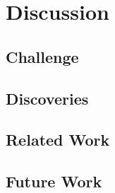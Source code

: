 \chapter{Discussion}
\label{chapter:discussion}

\section{Challenge}

\section{Discoveries}

\section{Related Work}

\section{Future Work}


